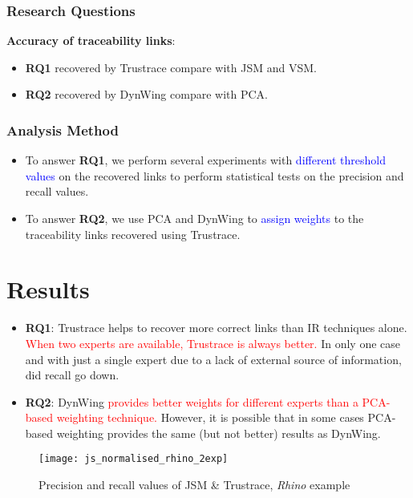 \documentclass[12pt,hyperref=true,mathserif]{beamer}
\begin{document}
\begin{frame}
\frametitle{Research Questions}
\textbf{Accuracy of traceability links}:
\begin{itemize}
  \item \textbf{RQ1} recovered by Trustrace compare with JSM and VSM.\\[8pt]
  \item \textbf{RQ2} recovered by DynWing compare with PCA.
\end{itemize}
\end{frame}

\begin{frame}
\frametitle{Analysis Method}
\begin{itemize}
  \item To answer \textbf{RQ1}, we perform several experiments with \textcolor{blue}{different threshold values} on the recovered links to perform statistical tests on the precision and recall values.\\[8pt]
  \item To answer \textbf{RQ2}, we use PCA and DynWing to \textcolor{blue}{assign weights} to the traceability links recovered using Trustrace.
\end{itemize}
\end{frame}


\section{Results}
\begin{frame}
\begin{itemize}
  \item \textbf{RQ1}: Trustrace helps to recover more correct links than IR techniques alone. \textcolor{red}{When two experts are available, Trustrace is always better.} In only one case and with just a single expert due to a lack of external source of information, did recall go down.\\[8pt]
  \item \textbf{RQ2}: DynWing \textcolor{red}{provides better weights for different experts than a PCA-based weighting technique.} However, it is possible that in some cases PCA-based weighting provides the same (but not better) results as DynWing.
\end{itemize}
\end{frame}

\begin{frame}
\begin{figure}
  \centering
  \texttt{[image: js\_normalised\_rhino\_2exp]}\\
  \caption{Precision and recall values of JSM \& Trustrace, \textit{Rhino} example}\label{fig:JSMRhino}
\end{figure}
\end{frame}
\end{document}
